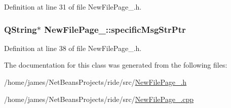 Definition at line 31 of file New\-File\-Page\-\_.\-h.

\hypertarget{class_new_file_page__3_aabe7247bb4d562591c46d245c1d71ad0}{
\subsubsection[{specific\-Msg\-Str\-Ptr}]{\setlength{\rightskip}{0pt plus 5cm}Q\-String$\ast$ New\-File\-Page\-\_\-::specific\-Msg\-Str\-Ptr\hspace{0.3cm}{\ttfamily [private]}}}\label{class_new_file_page__3_aabe7247bb4d562591c46d245c1d71ad0}


Definition at line 38 of file New\-File\-Page\-\_.\-h.



The documentation for this class was generated from the following files\-:\begin{DoxyCompactItemize}
\item 
/home/james/\-Net\-Beans\-Projects/ride/src/\hyperlink{_new_file_page__3_8h}{New\-File\-Page\-\_.\-h}\item 
/home/james/\-Net\-Beans\-Projects/ride/src/\hyperlink{_new_file_page__3_8cpp}{New\-File\-Page\-\_.\-cpp}\end{DoxyCompactItemize}
